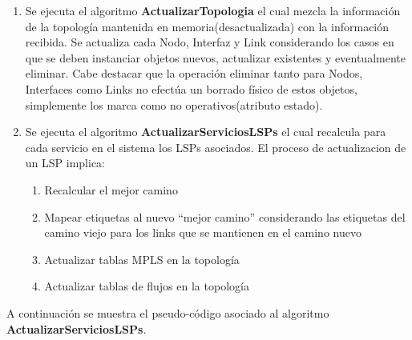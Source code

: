 \begin{enumerate}
\item Se ejecuta el algoritmo \textbf{ActualizarTopologia} el cual mezcla la informaci\'on de la topolog\'ia mantenida en memoria(desactualizada) con la informaci\'on recibida. Se actualiza cada Nodo, Interfaz y Link considerando los casos en que se deben instanciar objetos nuevos, actualizar existentes y eventualmente eliminar. Cabe destacar que la operaci\'on eliminar tanto para Nodos, Interfaces como Links no efectúa un borrado f\'isico de estos objetos, simplemente los marca como no operativos(atributo estado).  

\item Se ejecuta el algoritmo \textbf{ActualizarServiciosLSPs} el cual recalcula para cada servicio en el sistema los LSPs asociados. El proceso de actualizacion de un LSP implica:

\begin{enumerate}
\item Recalcular el mejor camino
\item Mapear etiquetas al nuevo “mejor camino” considerando las etiquetas del camino viejo para los links que se mantienen en el camino nuevo
\item Actualizar tablas MPLS en la topolog\'ia
\item Actualizar tablas de flujos en la topolog\'ia  
\end{enumerate}

\end{enumerate}    

A continuaci\'on se muestra el pseudo-c\'odigo asociado al algoritmo \textbf{ActualizarServiciosLSPs}. 

